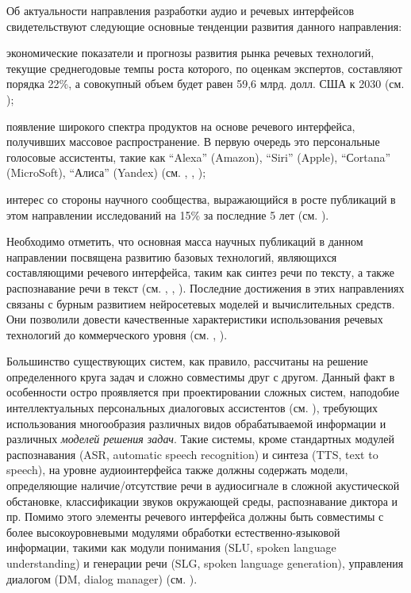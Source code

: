 Об актуальности направления разработки аудио и речевых интерфейсов свидетельствуют следующие основные тенденции развития данного направления:
\begin{textitemize}    
    \item экономические показатели и прогнозы развития рынка речевых технологий, текущие среднегодовые темпы роста которого, по оценкам экспертов, составляют порядка 22\%, а совокупный объем будет равен 59,6 млрд. долл. США к 2030 (см. );
    \item появление широкого спектра продуктов на основе речевого интерфейса, получивших массовое распространение. В первую очередь это персональные голосовые ассистенты, такие как  ``Alexa'' (Amazon), ``Siri'' (Apple), ``Сortana'' (MicroSoft), ``Алиса'' (Yandex) (см. , , );
    \item интерес со стороны научного сообщества, выражающийся в росте публикаций в этом направлении исследований на 15\% за последние 5 лет (см. ).
\end{textitemize}

Необходимо отметить, что основная масса научных публикаций в данном направлении посвящена развитию базовых технологий, являющихся составляющими речевого интерфейса, таким как синтез речи по тексту, а также распознавание речи в текст (см. , , ). Последние достижения в этих направлениях связаны с бурным развитием нейросетевых моделей и вычислительных средств. Они позволили довести качественные характеристики использования речевых технологий до коммерческого уровня (см. , ).

Большинство существующих систем, как правило, рассчитаны на решение определенного круга задач и сложно совместимы друг с другом. Данный факт в особенности остро проявляется при проектировании сложных систем, наподобие интеллектуальных персональных диалоговых ассистентов (см. \textit{}), требующих использования многообразия различных видов обрабатываемой информации и различных \textit{моделей решения задач}. Такие системы, кроме стандартных модулей распознавания (ASR, automatic speech recognition) и синтеза (TTS, text to speech), на уровне аудиоинтерфейса также должны содержать модели, определяющие наличие/отсутствие речи в аудиосигнале в сложной акустической обстановке, классификации звуков окружающей среды, распознавание диктора и пр. Помимо этого элементы речевого интерфейса должны быть совместимы с более высокоуровневыми модулями обработки естественно-языковой информации, такими как модули понимания (SLU, spoken language understanding) и генерации речи (SLG, spoken language generation), управления диалогом (DM, dialog manager) (см. ). 

